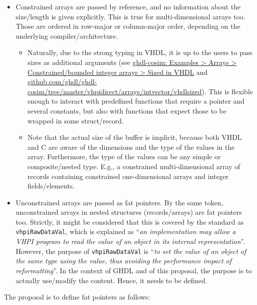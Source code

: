 \documentclass[
]{article}
\providecommand{\tightlist}{%
  \setlength{\itemsep}{0pt}\setlength{\parskip}{0pt}}
\begin{document}
\begin{itemize}
\tightlist
\item
  Constrained arrays are passed by reference, and no information about the size/length is given explicitly. This is true for multi-dimensional arrays too. Those are ordered in row-major or column-major order, depending on the underlying compiler/architecture.

  \begin{itemize}
  \tightlist
  \item
    Naturally, due to the strong typing in VHDL, it is up to the users to pass sizes as additional arguments (see \href{https://umarcor.github.io/ghdl-cosim/vhpidirect/examples/arrays.html\#sized-in-vhdl}{ghdl-cosim: Examples \textgreater{} Arrays \textgreater{} Constrained/bounded integer arrays \textgreater{} Sized in VHDL} and \href{https://github.com/ghdl/ghdl-cosim/tree/master/vhpidirect/arrays/intvector/vhdlsized}{github.com/ghdl/ghdl-cosim/tree/master/vhpidirect/arrays/intvector/vhdlsized}). This is flexible enough to interact with predefined functions that require a pointer and several constants, but also with functions that expect those to be wrapped in some struct/record.
  \item
    Note that the actual size of the buffer is implicit, because both VHDL and C are aware of the dimensions and the type of the values in the array. Furthermore, the type of the values can be any simple or composite/nested type. E.g., a constrained multi-dimensional array of records containing constrained one-dimensional arrays and integer fields/elements.
  \end{itemize}
\item
  Unconstrained arrays are passed as fat pointers. By the same token, unconstrained arrays in nested structures (records/arrays) are fat pointers too. Strictly, it might be considered that this is covered by the standard as \texttt{vhpiRawDataVal}, which is explained as ``\emph{an implementation may allow a VHPI program to read the value of an object in its internal representation}''. However, the purpose of \texttt{vhpiRawDataVal} is ``\emph{to set the value of an object of the same type using the value, thus avoiding the performance impact of reformatting}''. In the context of GHDL and of this proposal, the purpose is to actually use/modify the content. Hence, it needs to be defined.
\end{itemize}

The proposal is to define fat pointers as follows:
\end{document}
